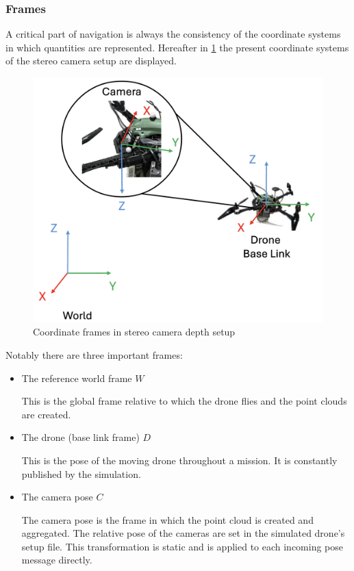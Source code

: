 \subsubsection{Frames}

A critical part of navigation is always the consistency of the coordinate systems in which quantities are represented. Hereafter in \cref{fig:frames} the present coordinate systems of the stereo camera setup are displayed. 

\begin{figure}[h]
\centering
\includegraphics[scale=0.2]{images/stereo_camera_depth/frames.png}
\caption{Coordinate frames in stereo camera depth setup}
\label{fig:frames}
\end{figure}

Notably there are three important frames:

\begin{itemize}
    \item The reference world frame $W$

    This is the global frame relative to which the drone flies and the point clouds are created.

    \item The drone (base link frame) $D$
    
    This is the pose of the moving drone throughout a mission. It is constantly published by the simulation.

    \item The camera pose $C$
    
    The camera pose is the frame in which the point cloud is created and aggregated. The relative pose of the cameras are set in the simulated drone's setup file. This transformation is static and is applied to each incoming pose message directly.
\end{itemize}

